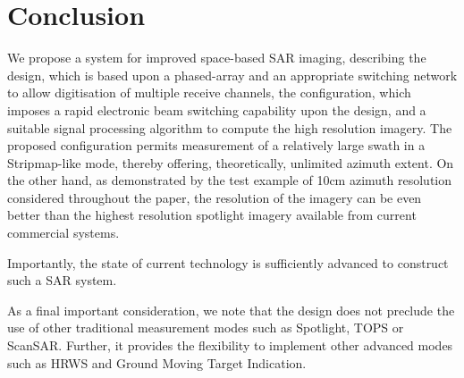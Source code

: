 \section{Conclusion}
We propose a system for improved space-based SAR imaging, describing the design, which is based upon a phased-array and an appropriate switching network to allow digitisation of multiple receive channels, the configuration, which imposes a rapid electronic beam switching capability upon the design, and a suitable signal processing algorithm to compute the high resolution imagery. The proposed configuration permits measurement of a relatively large swath in a Stripmap-like mode, thereby offering, theoretically, unlimited azimuth extent. On the other hand, as demonstrated by the test example of 10cm azimuth resolution considered throughout the paper, the resolution of the imagery can be even better than the highest resolution spotlight imagery available from current commercial systems.
\par
Importantly, the state of current technology is sufficiently advanced to construct such a SAR system.
\par
As a final important consideration, we note that the design does not preclude the use of other traditional measurement modes such as Spotlight, TOPS or ScanSAR. Further, it provides the flexibility to implement other advanced modes such as HRWS and Ground Moving Target Indication.
